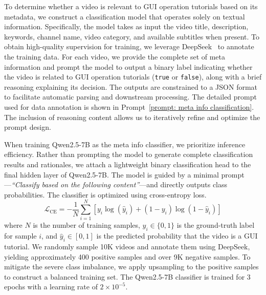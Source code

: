 \documentclass{article}
\theoremstyle{plain}
\theoremstyle{definition}
\theoremstyle{remark}
\begin{document}
To determine whether a video is relevant to GUI operation tutorials based on its metadata, we construct a classification model that operates solely on textual information. Specifically, the model takes as input the video title, description, keywords, channel name, video category, and available subtitles when present. To obtain high-quality supervision for training, we leverage DeepSeek~\cite{liu2024deepseek} to annotate the training data. For each video, we provide the complete set of meta information and prompt the model to output a binary label indicating whether the video is related to GUI operation tutorials (\texttt{true} or \texttt{false}), along with a brief reasoning explaining its decision. The outputs are constrained to a JSON format to facilitate automatic parsing and downstream processing. The detailed prompt used for data annotation is shown in Prompt~\ref{prompt: meta info classification}. The inclusion of reasoning content allows us to iteratively refine and optimize the prompt design.

When training Qwen2.5-7B as the meta info classifier, we prioritize inference efficiency. Rather than prompting the model to generate complete classification results and rationales, we attach a lightweight binary classification head to the final hidden layer of Qwen2.5-7B. The model is guided by a minimal prompt—\emph{``Classify based on the following content''}—and directly outputs class probabilities. The classifier is optimized using cross-entropy loss.
\begin{equation}
\mathcal{L}_{\text{CE}} = -\frac{1}{N}\sum_{i=1}^{N}\left[y_i\log(\hat{y}_i) + (1-y_i)\log(1-\hat{y}_i)\right]
\end{equation}
where $N$ is the number of training samples, $y_i \in \{0, 1\}$ is the ground-truth label for sample $i$, and $\hat{y}_i \in [0, 1]$ is the predicted probability that the video is a GUI tutorial.
We randomly sample 10K videos and annotate them using DeepSeek, yielding approximately 400 positive samples and over 9K negative samples. To mitigate the severe class imbalance, we apply upsampling to the positive samples to construct a balanced training set. The Qwen2.5-7B classifier is trained for 3 epochs with a learning rate of $2 \times 10^{-5}$.
\end{document}
